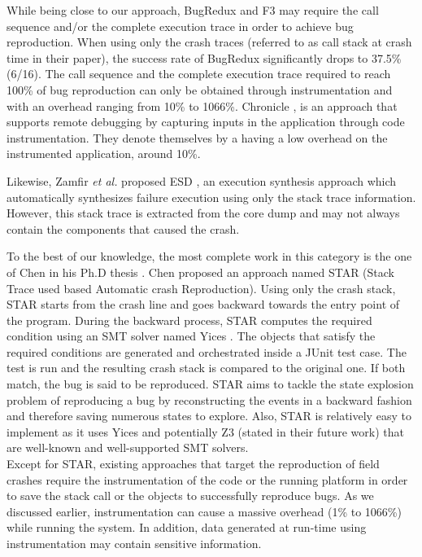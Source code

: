 \documentclass[times]{smrauth}
\begin{document}
While being close to our approach, BugRedux and F3 may require the call sequence and/or the complete execution trace in order to achieve bug reproduction. When using only the crash traces (referred to as call stack at crash time in their paper), the success rate of BugRedux significantly drops to 37.5\% (6/16). The call sequence and the complete execution trace required to reach 100\% of bug reproduction can only be obtained through instrumentation and with an overhead ranging from 10\% to 1066\%. Chronicle \cite{Bell2013}, is an approach that supports remote debugging by capturing inputs in the application through code instrumentation. 
They denote themselves by a having a low overhead on the instrumented application, around 10\%.

Likewise, Zamfir {\it et al.} proposed ESD \cite{Zamfir2010}, an execution synthesis approach which automatically synthesizes failure execution using only the stack trace information. However, this stack trace is extracted from the core dump and may not always contain the components that caused the crash.

To the best of our knowledge, the most complete work in this category is the one of Chen in his Ph.D thesis \cite{Chen2013a}. Chen proposed an approach named STAR (Stack Trace used based Automatic crash Reproduction). Using only the crash stack, STAR starts from the crash line and goes backward towards the entry point of the program. During the backward process, STAR computes the required condition using an SMT solver named Yices \cite{Dutertre2006}. The objects that satisfy the required conditions are generated and orchestrated inside a JUnit test case. The test is run and the resulting crash stack is compared to the original one. If both match, the bug is said to be reproduced. STAR aims to tackle the state explosion problem of reproducing a bug by reconstructing the events in a backward fashion and therefore saving numerous states to explore. Also, STAR is relatively easy to implement as it uses Yices \cite{Dutertre2006} and potentially Z3 \cite{de2008z3} (stated in their future work) that are well-known and well-supported SMT solvers. \\

Except for STAR, existing approaches that target the reproduction of field crashes require the instrumentation of the code or the running platform in order to save the stack call or the objects to successfully reproduce bugs. As we discussed earlier, instrumentation can cause a massive overhead (1\% to 1066\%) while running the system. In addition, data generated at run-time using instrumentation may contain sensitive information.
\end{document}
